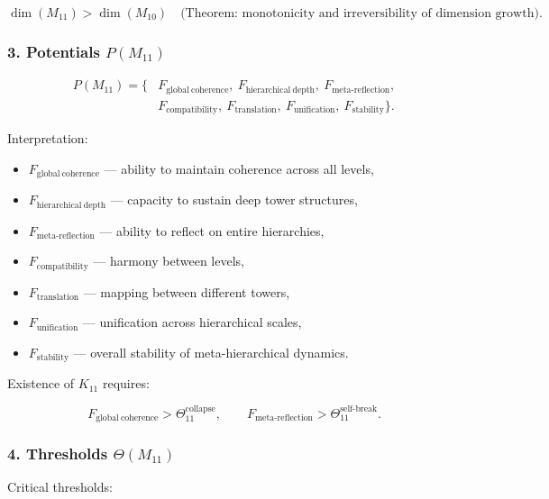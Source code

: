 \[
\dim(M_{11}) > \dim(M_{10})
\quad\text{(Theorem: monotonicity and irreversibility of dimension growth)}.
\]

\subsubsection*{3. Potentials $P(M_{11})$}

\[
\begin{aligned}
P(M_{11}) = \{&
F_{\mathrm{global\ coherence}},\ 
F_{\mathrm{hierarchical\ depth}},\ 
F_{\mathrm{meta\mbox{-}reflection}},\\
&
F_{\mathrm{compatibility}},\ 
F_{\mathrm{translation}},\ 
F_{\mathrm{unification}},\ 
F_{\mathrm{stability}}
\}.
\end{aligned}
\]

Interpretation:

\begin{itemize}
    \item $F_{\mathrm{global\ coherence}}$ — ability to maintain 
        coherence across all levels,
    \item $F_{\mathrm{hierarchical\ depth}}$ — capacity to sustain deep tower structures,
    \item $F_{\mathrm{meta\mbox{-}reflection}}$ — ability to reflect on entire hierarchies,
    \item $F_{\mathrm{compatibility}}$ — harmony between levels,
    \item $F_{\mathrm{translation}}$ — mapping between different towers,
    \item $F_{\mathrm{unification}}$ — unification across hierarchical scales,
    \item $F_{\mathrm{stability}}$ — overall stability of meta-hierarchical dynamics.
\end{itemize}

Existence of $K_{11}$ requires:

\[
F_{\mathrm{global\ coherence}} > \Theta_{11}^{\mathrm{collapse}},
\qquad
F_{\mathrm{meta\mbox{-}reflection}} > \Theta_{11}^{\mathrm{self\mbox{-}break}}.
\]

\subsubsection*{4. Thresholds $\Theta(M_{11})$}

Critical thresholds:

